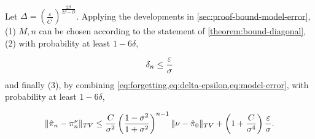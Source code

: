 \paragraph{}

Let $\Delta= \left(\frac{\varepsilon}{C^\prime}\right)^{\frac{2\beta}{2\beta - D}}$. Applying the developments in \cref{sec:proof-bound-model-error}, (1) $M, n$ can be chosen according to the statement of \cref{theorem:bound-diagonal}, (2)  with probability at least $1-6\delta$,

\begin{align}\label{eq:delta-epsilon}
    \delta_n \leq \frac{\varepsilon}{\sigma}
\end{align}
and finally (3), by combining \cref{eq:forgetting,eq:delta-epsilon,eq:model-error}, with probability at least $1 - 6\delta$,

\begin{align}
\Vert \hat\pi_n - \pi_n^\nu \Vert_{TV} \leq \frac{C}{\sigma^2}\left(\frac{1 - \sigma^2}{1+\sigma^2}\right)^{n-1}\Vert \nu - \hat \pi_0\Vert_{TV} + \left(1 + \frac{C}{\sigma^4}\right)\frac{\varepsilon}{\sigma}.
\end{align}
